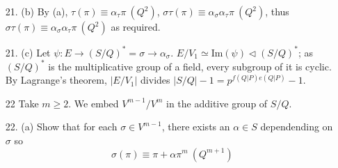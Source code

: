 \documentclass{article}
\newcommand{\image}[1]{\text{Im}(#1)}
\newcommand{\modequiv}[3]{#1 \equiv #2\ (#3)}
\newtheorem{lemma}{Lemma}
\begin{document}
\begin{enumerate}
If $(\pi) = Q$ then take $\modequiv{x}{\sigma(\pi)}{Q^2}$; $\sigma(\pi) - x \in Q^2$

\begin{lemma}
    If $\modequiv{x}{\sigma(\pi)}{Q^2}$ and $\sigma \in E$, then $x \in Q$.
\end{lemma}
\begin{proof}
    As $\sigma(\pi) - x \in Q^2$, $\pi(\sigma(\pi) - x) \in Q^2$.  Because $\sigma \in E$, $\pi\sigma(\pi) \in Q^2$, subtracting this shows that $\pi x \in Q^2$.  Because $\pi \not\in Q^2$, $x \in Q$.
\end{proof}

We split the proof into two parts based on whether $\pi$ generates $Q$ or not.

If $(\pi) = Q$, take $\modequiv{x}{\sigma(\pi)}{Q^2}$: by the above lemma, $x \in Q$ and so $x = \alpha \pi$.

Otherwise, let $(\pi) = QI$ with $Q, I$ relatively prime.  We take $x$ be the solution to the system of congruences
\[
    \begin{array}{llll}
        x &\equiv& \sigma(\pi)\ & (Q^2) \\
        x &\equiv& 0\ & (I) \\
    \end{array}
\]

By the above lemma, $x \in Q, I$.  Since $Q, I$ are coprime ideals, $Q \cap I = QI$ and so $x \in QI = (\pi)$.  Therefore $x = \alpha \pi$ for some $\alpha \in S$ and $\sigma(\pi) \equiv \alpha \pi \pmod{Q^2}$, the required result.

\item[21. (b)] By (a), $\modequiv{\tau(\pi)}{\alpha_{\tau}\pi}{Q^2}$, $\modequiv{\sigma\tau(\pi)}{\alpha_{\sigma}\alpha_{\tau}\pi}{Q^2}$, thus $\modequiv{\sigma\tau (\pi)}{\alpha_{\sigma}\alpha_{\tau}\pi}{Q^2}$ as required.

\item[21. (c)] Let $\psi : E \to (S / Q)^{*} = \sigma \to \alpha_{\sigma}$.  $E / V_1 \simeq \image\psi \triangleleft (S / Q)^{*}$; as $(S / Q)^{*}$ is the multiplicative group of a field, every subgroup of it is cyclic.  By Lagrange's theorem, $|E / V_1|$ divides $|S / Q| - 1 = p^{f(Q|P)e(Q|P)} - 1$.

\item[22]  Take $m \ge 2$.  We embed $V^{m - 1} / V^{m}$ in the additive group of $S / Q$.
\item[22. (a)]  Show that for each $\sigma \in V^{m - 1}$, there exists an $\alpha \in S$ dependending on $\sigma$ so \[ \modequiv{\sigma(\pi)}{\pi + \alpha\pi^m}{Q^{m+1}} \]


\end{enumerate}
\end{document}
